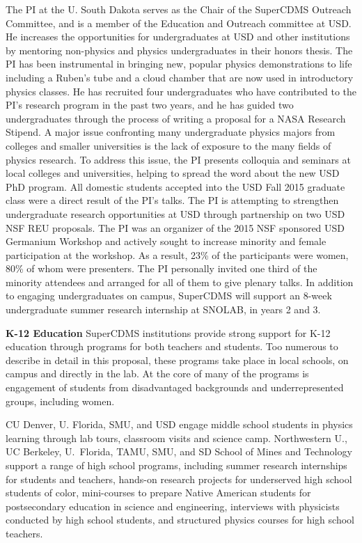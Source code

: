 The PI at the U. South Dakota serves as the Chair of the SuperCDMS Outreach Committee, and is a member of the Education and Outreach committee at USD. He increases the opportunities for undergraduates at USD and other institutions by mentoring non-physics and physics undergraduates in their honors thesis. The PI has been instrumental in bringing new, popular physics demonstrations to life including a Ruben’s tube and a cloud chamber that are now used in introductory physics classes. He has recruited four undergraduates who have contributed to the PI’s research program in the past two years, and he has guided two undergraduates through the process of writing a proposal for a NASA Research Stipend. A major issue confronting many undergraduate physics majors from colleges and smaller universities is the lack of exposure to the many fields of physics research. To address this issue, the PI presents colloquia and seminars at local colleges and universities, helping to spread the word about the new USD PhD program. All domestic students accepted into the USD Fall 2015 graduate class were a direct result of the PI’s talks. The PI is attempting to strengthen undergraduate research opportunities at USD through partnership on two USD NSF REU proposals. The PI was an organizer of the 2015 NSF sponsored USD Germanium Workshop and actively sought to increase minority and female participation at the workshop. As a result, 23\% of the participants were women, 80\% of whom were presenters. The PI personally invited one third of the minority attendees and arranged for all of them to give plenary talks. 
In addition to engaging undergraduates on campus, SuperCDMS will support an 8-week undergraduate summer research internship at SNOLAB, in years 2 and 3.

\textbf{K-12 Education}
SuperCDMS institutions provide strong support for K-12 education through programs for both teachers and students. Too numerous to describe in detail in this proposal, these programs take place in local schools, on campus and directly in the lab. At the core of many of the programs is engagement of students from disadvantaged backgrounds and underrepresented groups, including women. 

CU Denver, U. Florida, SMU, and USD engage middle school students in physics learning through lab tours, classroom visits and science camp. Northwestern U., UC Berkeley, U.~Florida, TAMU, SMU, and SD School of Mines and Technology support a range of high school programs, including summer research internships for students and teachers, hands-on research projects for underserved high school students of color, mini-courses to prepare Native American students for postsecondary education in science and engineering, interviews with physicists conducted by high school students, and structured physics courses for high school teachers. 

